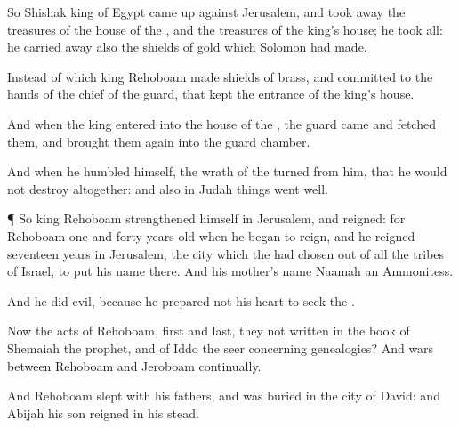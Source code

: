 {So
Shishak
king of
Egypt came
up against
Jerusalem, and took
away the
treasures of the
house of the
{}, and the
treasures of the
king’s
house; he
took all: he carried
away also the
shields of
gold which
Solomon had
made.

Instead of which
king
Rehoboam
made
shields of
brass, and
committed
{} to the
hands of the
chief of the
guard, that
kept the
entrance of the
king’s
house.

And
when the
king
entered into the
house of the
{}, the
guard
came and
fetched them, and brought them
again into the
guard
chamber.

And when he
humbled himself, the
wrath of the
{}
turned from him, that he would not
destroy
{}
altogether: and also in
Judah
things went
well.


\par }{\PP {}¶ So
king
Rehoboam
strengthened himself in
Jerusalem, and
reigned: for
Rehoboam
{}
one and
forty
years
old when he began to
reign, and he
reigned
seventeen
years in
Jerusalem, the
city which the
{} had
chosen out of all the
tribes of
Israel, to
put his
name there. And his
mother’s
name
{}
Naamah an
Ammonitess.

And he
did
evil, because he
prepared not his
heart to
seek the
{}.

Now the
acts of
Rehoboam,
first and
last,
{} they not
written in the
book of
Shemaiah the
prophet, and of
Iddo the
seer concerning
genealogies? And
{}
wars between
Rehoboam and
Jeroboam
continually.

And
Rehoboam
slept with his
fathers, and was
buried in the
city of
David: and
Abijah his
son
reigned in his stead.




\par }
